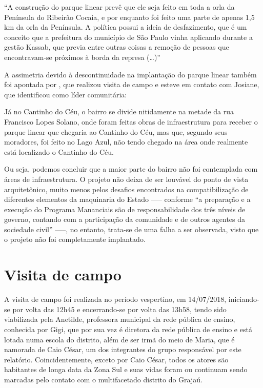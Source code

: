 	\begin{citacao}
	    ``A construção do parque linear prevê que ele seja feito em toda a orla da Península do Ribeirão Cocaia, e por enquanto foi feito uma parte de apenas 1,5 km da orla da Península. A política possui a ideia de desfazimento, que é um conceito que a prefeitura do município de São Paulo vinha aplicando durante a gestão Kassab, que previa entre outras coisas a remoção de pessoas que encontravam-se próximos à borda da represa (\dots)''
    \end{citacao}
    
    A assimetria devido à descontinuidade na implantação do parque linear também foi apontada por , que realizou visita de campo e esteve em contato com Josiane, que identificou como líder comunitária:
    
    \begin{citacao}
		Já no Cantinho do Céu, o bairro se divide nitidamente na metade da rua Francisco Lopes Solano, onde foram feitas obras de infraestrutura para receber o parque linear que chegaria ao Cantinho do Céu, mas que, segundo seus moradores, foi feito no Lago Azul, não tendo chegado na área onde realmente está localizado o Cantinho do Céu.
    \end{citacao}
    
    Ou seja, podemos concluir que a maior parte do bairro não foi contemplada com áreas de infraestrutura. O projeto não deixa de ser louvável do ponto de vista arquitetônico, muito menos pelos desafios encontrados na compatibilização de diferentes elementos da maquinaria do Estado ----- conforme  ``a preparação e a execução do Programa Mananciais são de responsabilidade dos três níveis de governo, contando com a participação da comunidade e de outros agentes da sociedade civil'' -----, no entanto, trata-se de uma falha a ser observada, visto que o projeto não foi completamente implantado.
	
	\section{Visita de campo} \label{visita}
	
	A visita de campo foi realizada no período vespertino, em 14/07/2018, iniciando-se por volta das 12h45 e encerrando-se por volta das 13h58, tendo sido viabilizada pela Anetilde, professora municipal da rede pública de ensino, conhecida por Gigi, que por sua vez é diretora da rede pública de ensino e está lotada numa escola do distrito, além de ser irmã do meio de Maria, que é namorada de Caio César, um dos integrantes do grupo responsável por este relatório. Coincidentemente, exceto por Caio César, todos os atores são habitantes de longa data da Zona Sul e suas vidas foram ou continuam sendo marcadas pelo contato com o multifacetado distrito do Grajaú.
	
